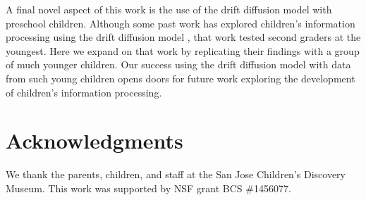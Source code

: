\documentclass[10pt,letterpaper]{article}
\begin{document}
A final novel aspect of this work is the use of the drift diffusion model with preschool children. Although some past work has explored children's information processing using the drift diffusion model \cite{ratcliff2012}, that work tested second graders at the youngest. Here we expand on that work by replicating their findings with a group of much younger children. Our success using the drift diffusion model with data from such young children opens doors for future work exploring the development of children's information processing.

\section{Acknowledgments}
%
We thank the parents, children, and staff at the San Jose Children's Discovery Museum. This work was supported by NSF grant BCS \#1456077.




\setlength{\bibleftmargin}{.125in}
\setlength{\bibindent}{-\bibleftmargin}


\end{document}
